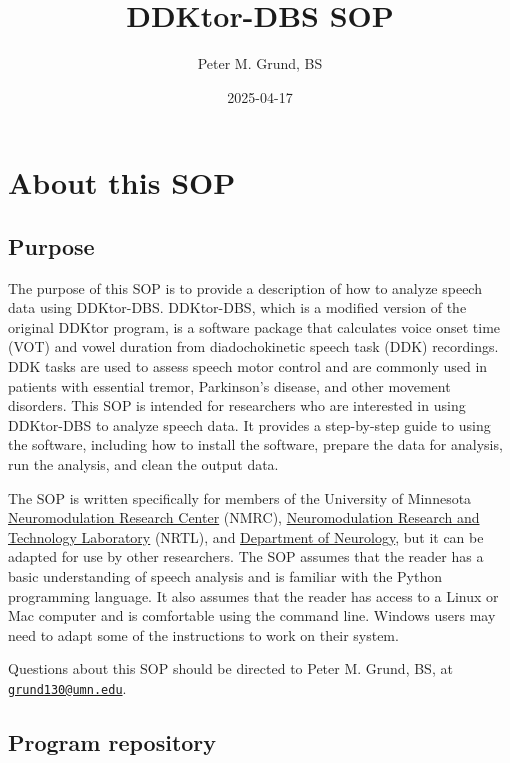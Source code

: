 \documentclass[
]{book}
\title{DDKtor-DBS SOP}
\author{Peter M. Grund, BS}
\date{2025-04-17}
\begin{document}
\maketitle

{
\setcounter{tocdepth}{1}
\tableofcontents
}
\chapter{About this SOP}\label{about-this-sop}

\section{Purpose}\label{purpose}

The purpose of this SOP is to provide a description of how to analyze speech data using DDKtor-DBS. DDKtor-DBS, which is a modified version of the original DDKtor program, is a software package that calculates voice onset time (VOT) and vowel duration from diadochokinetic speech task (DDK) recordings. DDK tasks are used to assess speech motor control and are commonly used in patients with essential tremor, Parkinson's disease, and other movement disorders. This SOP is intended for researchers who are interested in using DDKtor-DBS to analyze speech data. It provides a step-by-step guide to using the software, including how to install the software, prepare the data for analysis, run the analysis, and clean the output data.

The SOP is written specifically for members of the University of Minnesota \href{https://nmrc.umn.edu}{Neuromodulation Research Center} (NMRC), \href{https://neuromod.umn.edu/}{Neuromodulation Research and Technology Laboratory} (NRTL), and \href{https://med.umn.edu/neurology}{Department of Neurology}, but it can be adapted for use by other researchers. The SOP assumes that the reader has a basic understanding of speech analysis and is familiar with the Python programming language. It also assumes that the reader has access to a Linux or Mac computer and is comfortable using the command line. Windows users may need to adapt some of the instructions to work on their system.

Questions about this SOP should be directed to Peter M. Grund, BS, at \href{mailto:grund130@umn.edu}{\nolinkurl{grund130@umn.edu}}.

\section{Program repository}\label{program-repository}
\end{document}
